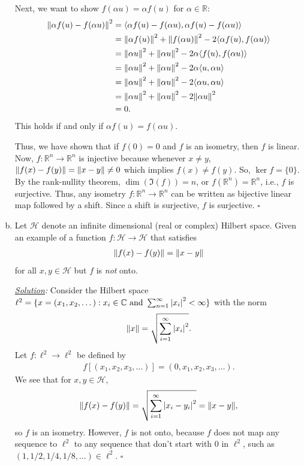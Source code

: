 \documentclass[11pt]{article}
\begin{document}
\begin{enumerate}[(a)]
	
	Next, we want to show $f(\alpha u) = \alpha f(u)$ for $\alpha \in \mathbb{R}$:
	\begin{align*}
	\norm{\alpha f(u) - f(\alpha u)}^2 &= \langle \alpha f(u) - f(\alpha u), \alpha f(u) - f(\alpha u)  \rangle\\
	&= \norm{\alpha f(u)}^2 + \norm{f(\alpha u)}^2 -2\langle \alpha f(u),f(\alpha u) \rangle  \\
	&= \norm{\alpha u}^2 + \norm{\alpha u}^2 -2 \alpha\langle  f(u),f(\alpha u) \rangle \\
	&= \norm{\alpha u}^2 + \norm{\alpha u}^2 -2 \alpha\langle  u,\alpha u \rangle \\
	&= \norm{\alpha u}^2 + \norm{\alpha u}^2 -2 \langle \alpha u,\alpha u \rangle \\
	&= \norm{\alpha u}^2 + \norm{\alpha u}^2 -2\norm{\alpha u}^2 \\
	&= 0.
	\end{align*}
	This holds if and only if $\alpha f(u) = f(\alpha u)$. 
	
	
	Thus, we have shown that if $f(0) = 0$ and $f$ is an isometry, then $f$ is linear. Now, $f: \mathbb{R}^n \to \mathbb{R}^n$ is injective because whenever $x\neq y$, $\norm{f(x) - f(y)} = \norm{x-y} \neq 0$ which implies $f(x)\neq f(y)$. So, $\ker{f} = \{0\}$. By the rank-nullity theorem, $\dim\left( \Im(f)\right) = n$, or $f(\mathbb{R}^n) = \mathbb{R}^n$, i.e., $f$ is surjective. Thus, any isometry $f: \mathbb{R}^n \to \mathbb{R}^n$ can be written as bijective linear map followed by a shift. Since a shift is surjective, $f$ is surjective. \hfill$\square$ 
	
	
	
	
	
	\item Let $\mathcal{H}$ denote an infinite dimensional (real or complex) Hilbert space. Given an example of a function $f: \mathcal{H} \to \mathcal{H}$ that satisfies 
	\begin{align*}
	\norm{f(x) - f(y)} = \norm{x-y}
	\end{align*} 
	for all $x,y\in \mathcal{H}$ but $f$ is \textit{not} onto. 
	
	
	
	
	\noindent \textit{\underline{Solution}:} Consider the Hilbert space $\ell^2 = \{x = (x_1,x_2,\dots): x_i \in \mathbb{C} \mbox{ and } \sum^\infty_{n=1}\abs{x_i}^2 < \infty  \} $ with the norm
	\begin{align*}
	\norm{x} = \sqrt{\sum^\infty_{i=1}\abs{x_i}^2}.
	\end{align*} 
	Let $f: \ell^2 \to \ell^2$ be defined by
	\begin{align*}
	f[(x_1,x_2,x_3,\dots)] = (0,x_1,x_2,x_3,\dots).
	\end{align*}
	We see that for $x,y\in \mathcal{H}$, 
	\begin{align*}
	\norm{f(x)-f(y)} = \sqrt{\sum^\infty_{i=1}\abs{x_i - y_i}^2} = \norm{x-y},
	\end{align*}
	so $f$ is an isometry. However, $f$ is not onto, because $f$ does not map any sequence to $\ell^2$ to any sequence that don't start with $0$ in $\ell^2$, such as $(1,1/2,1/4,1/8,\dots) \in \ell^2$. \hfill $\square$ 
\end{enumerate}
\end{document}
